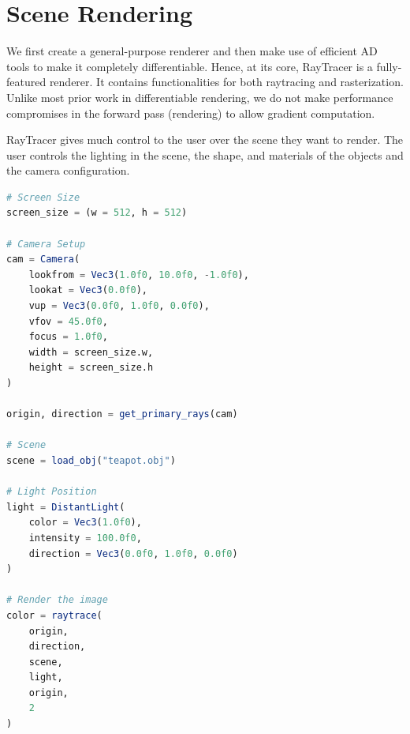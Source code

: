 \documentclass{juliacon}
\begin{document}
\section{Scene Rendering}

We first create a general-purpose renderer and then make use of efficient AD tools to make it completely differentiable. Hence, at its core, RayTracer is a fully-featured renderer. It contains functionalities for both raytracing and rasterization. Unlike most prior work in differentiable rendering, we do not make performance compromises in the forward pass (rendering) to allow gradient computation.

RayTracer gives much control to the user over the scene they want to render. The user controls the lighting in the scene, the shape, and materials of the objects and the camera configuration.

\noindent
\begin{minipage}{\linewidth}
\begin{lstlisting}[caption = {Rendering the Utah Teapot Model},
                   label = {lst:example_render},
                   captionpos = b,
                   language = Julia]
# Screen Size
screen_size = (w = 512, h = 512)
    
# Camera Setup
cam = Camera(
    lookfrom = Vec3(1.0f0, 10.0f0, -1.0f0),
    lookat = Vec3(0.0f0),
    vup = Vec3(0.0f0, 1.0f0, 0.0f0),
    vfov = 45.0f0,
    focus = 1.0f0,
    width = screen_size.w,
    height = screen_size.h
)
                 
origin, direction = get_primary_rays(cam)
    
# Scene
scene = load_obj("teapot.obj")
    
# Light Position
light = DistantLight(
    color = Vec3(1.0f0),
    intensity = 100.0f0,
    direction = Vec3(0.0f0, 1.0f0, 0.0f0)
)
                         
# Render the image
color = raytrace(
    origin,
    direction,
    scene,
    light,
    origin,
    2
)
\end{lstlisting}
\end{minipage}
\end{document}
